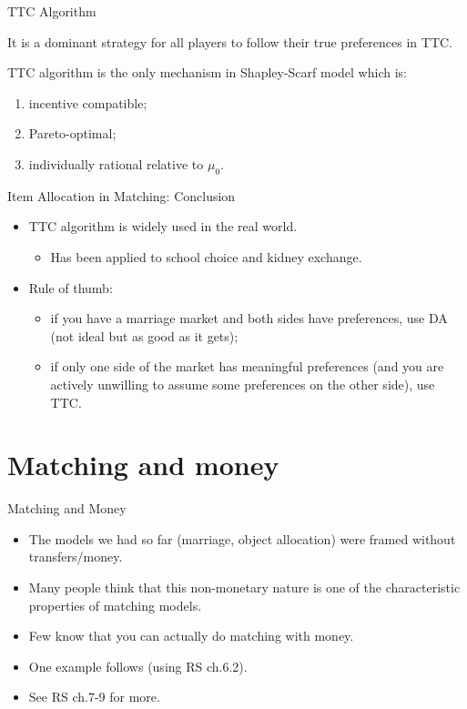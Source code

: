 \documentclass[english,10pt
,aspectratio=169
]{beamer}
\begin{document}
\begin{frame}{TTC Algorithm}
\begin{theorem}[Roth '82]
	It is a dominant strategy for all players to follow their true preferences in TTC.
\end{theorem}
\begin{theorem}
	TTC algorithm is the only mechanism in Shapley-Scarf model which is:
	\begin{enumerate}
		\item incentive compatible;
		\item Pareto-optimal;
		\item individually rational relative to $\mu_0$.
	\end{enumerate}
\end{theorem}
\end{frame}


\begin{frame}{Item Allocation in Matching: Conclusion}
\begin{itemize}
	\item TTC algorithm is widely used in the real world.
	\begin{itemize}
		\item Has been applied to school choice and kidney exchange.
	\end{itemize}
	\item Rule of thumb:
	\begin{itemize}
		\item if you have a marriage market and both sides have preferences, use DA (not ideal but as good as it gets);
		\item if only one side of the market has meaningful preferences (and you are actively unwilling to assume some preferences on the other side), use TTC.
	\end{itemize}
\end{itemize}
\end{frame}



\section{Matching and money}

\begin{frame}{Matching and Money}
\begin{itemize}
	\item The models we had so far (marriage, object allocation) were framed without transfers/money.
	\item Many people think that this non-monetary nature is one of the characteristic properties of matching models.
	\item Few know that you can actually do matching with money.
	\item One example follows (using RS ch.6.2).
	\item See RS ch.7-9 for more.
\end{itemize}
\end{frame}
\end{document}
